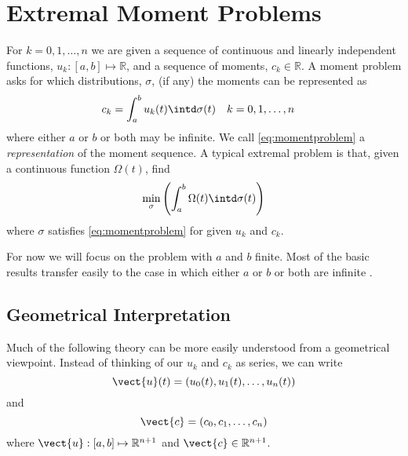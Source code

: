 \chapter{Extremal Moment Problems}
\label{Ch: MomentProblems}


For $k = 0,1,\dots,n$ we are given a sequence of continuous and linearly independent functions, $u_k: [a,b] \mapsto \mathbb{R}$, and a sequence of moments, $c_k \in \mathbb{R}$. A moment problem asks for which distributions, $\sigma$, (if any) the moments can be represented as
\begin{align}
c_k &= \int_a^b u_k(t) \intd \sigma(t) && k = 0,1,\dots,n
\label{eq:momentproblem}
\end{align}
where either $a$ or $b$ or both may be infinite. We call \eqref{eq:momentproblem} a \emph{representation} of the moment sequence. A typical extremal problem is that, given a continuous function $\Omega(t)$, find
\begin{equation}
\min_\sigma \left( \int_a^b \Omega(t) \intd \sigma(t)\right)
\end{equation}
where $\sigma$ satisfies \eqref{eq:momentproblem} for given $u_k$ and $c_k$.

For now we will focus on the problem with $a$ and $b$ finite. Most of the basic results transfer easily to the case in which either $a$ or $b$ or both are infinite \cite{Krein1977-ak}. 

\section{Geometrical Interpretation}
Much of the following theory can be more easily understood from a geometrical viewpoint. Instead of thinking of our $u_k$ and $c_k$ as series, we can write
\begin{equation}
\vect{u}(t) = (u_0(t),u_1(t),\dots,u_n(t))
\end{equation}
and
\begin{equation}
\vect{c} = (c_0,c_1,\dots,c_n)
\end{equation}
where $\vect{u}: [a,b] \mapsto \mathbb{R}^{n+1}$ and $\vect{c} \in \mathbb{R}^{n+1}$.

